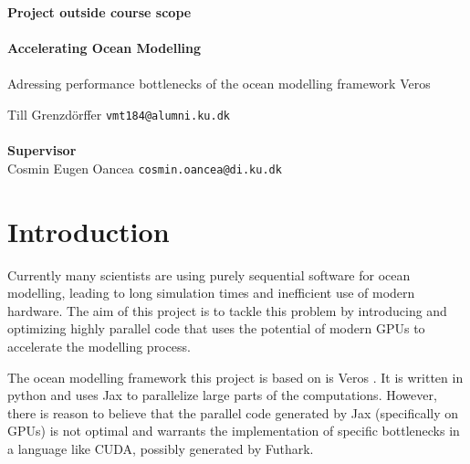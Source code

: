 \documentclass[a4paper,oneside]{memoir}
\begin{document}
    \thispagestyle{empty}
    \begin{adjustwidth}{-3cm}{-1.5cm}
    \vspace*{-1cm}
    \textbf{\Huge Project outside course scope} \\
    \vspace*{2.5cm} \\
    \textbf{\Huge Accelerating Ocean Modelling} \\
    \vspace*{.1cm} \\
    {\huge Adressing performance bottlenecks of the ocean modelling framework Veros} \\
    \begin{tabbing}
    Till Grenzdörffer \hspace{1cm} \= \texttt{vmt184@alumni.ku.dk} \\
    \\[12cm]
    \textbf{\Large Supervisor} \\
    Cosmin Eugen Oancea \> \texttt{cosmin.oancea@di.ku.dk} \\
    \end{tabbing}
    \end{adjustwidth}
    \newpage
    \ClearWallPaper



\section{Introduction}
Currently many scientists are using purely sequential software for ocean modelling, leading to long simulation times and inefficient use of modern hardware. 
The aim of this project is to tackle this problem by introducing and optimizing highly parallel code that uses the potential of modern GPUs to accelerate the modelling process.

The ocean modelling framework this project is based on is Veros \cite{veros}. It is written in python and uses Jax \cite{jax2018github} to parallelize large parts of the computations.
However, there is reason to believe that the parallel code generated by Jax (specifically on GPUs) is not optimal and warrants the implementation of specific bottlenecks in a language like CUDA, possibly generated by Futhark.
\end{document}
